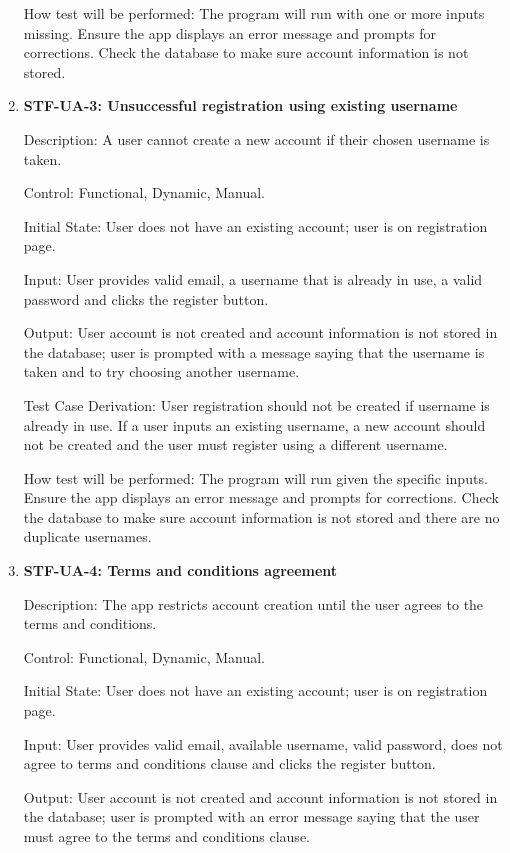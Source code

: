 \documentclass[12pt, titlepage]{article}
\begin{document}
\begin{enumerate}
        How test will be performed: The program will run with one or more inputs missing. Ensure the app displays an error message and prompts for corrections. Check the database to make sure account information is not stored.

        \item{\textbf{STF-UA-3: Unsuccessful registration using existing username}\\}

        Description: A user cannot create a new account if their chosen username is taken.

        Control:  Functional, Dynamic, Manual.

        Initial State: User does not have an existing account; user is on registration page.

        Input: User provides valid email, a username that is already in use, a valid password and clicks the register button.

        Output: User account is not created and account information is not stored in the database; user is prompted with a message saying that the username is taken and to try choosing another username.

        Test Case Derivation: User registration should not be created if username is already in use. If a user inputs an existing username, a new account should not be created and the user must register using a different username.

        How test will be performed: The program will run given the specific inputs. Ensure the app displays an error message and prompts for corrections. Check the database to make sure account information is not stored and there are no duplicate usernames.

        \item{\textbf{STF-UA-4: Terms and conditions agreement}\\}

        Description: The app restricts account creation until the user agrees to the terms and conditions.

        Control: Functional, Dynamic, Manual.

        Initial State: User does not have an existing account; user is on registration page.

        Input: User provides valid email, available username, valid password, does not agree to terms and conditions clause and clicks the register button.

        Output: User account is not created and account information is not stored in the database; user is prompted with an error message saying that the user must agree to the terms and conditions clause.


\end{enumerate}
\end{document}
